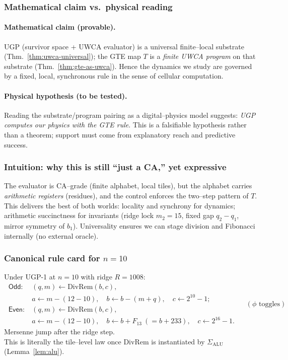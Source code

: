 \documentclass[12pt]{article}
\numberwithin{equation}{section}
\begin{document}
\subsubsection{Mathematical claim vs.\ physical reading}\label{subsec:scope-claim}
\paragraph{Mathematical claim (provable).} UGP (survivor space + UWCA evaluator) is a universal finite–local substrate (Thm.~\ref{thm:uwca-universal}); the GTE map \(T\) is a \emph{finite UWCA program} on that substrate (Thm.~\ref{thm:gte-as-uwca}). Hence the dynamics we study are governed by a fixed, local, synchronous rule in the sense of cellular computation.

\paragraph{Physical hypothesis (to be tested).} Reading the substrate/program pairing as a digital–physics model suggests: \emph{UGP computes our physics with the GTE rule}. This is a falsifiable hypothesis rather than a theorem; support must come from explanatory reach and predictive success.

\subsubsection{Intuition: why this is still ``just a CA,'' yet expressive}\label{subsec:intuition}
The evaluator is CA–grade (finite alphabet, local tiles), but the alphabet carries \emph{arithmetic registers} (residues), and the control enforces the two–step pattern of \(T\). This delivers the best of both worlds: locality and synchrony for dynamics; arithmetic succinctness for invariants (ridge lock \(m_2{=}15\), fixed gap \(q_2{-}q_1\), mirror symmetry of \(b_1\)). Universality ensures we can stage division and Fibonacci internally (no external oracle).

\subsubsection{Canonical rule card for \(n=10\)}\label{subsec:short-rule-card}
Under UGP-1 at \(n{=}10\) with ridge \(R=1008\):
\[
\boxed{\ \begin{aligned}
\textsf{Odd:}\ & (q,m)\leftarrow \mathrm{DivRem}(b,c),\\
& a\leftarrow m-(12-10),\quad b\leftarrow b-(m+q),\quad c\leftarrow 2^{10}-1;\\[4pt]
\textsf{Even:}\ & (q,m)\leftarrow \mathrm{DivRem}(b,c),\\
& a\leftarrow m-(12-10),\quad b\leftarrow b+F_{13}\ (=b+233),\quad c\leftarrow 2^{16}-1.
\end{aligned}\ }\quad (\phi\text{ toggles})
\]
\noindent
Mersenne jump after the ridge step.\\
This is literally the tile–level law once \(\mathrm{DivRem}\) is instantiated by \(\Sigma_{\mathrm{ALU}}\) (Lemma~\ref{lem:alu}).
\end{document}
